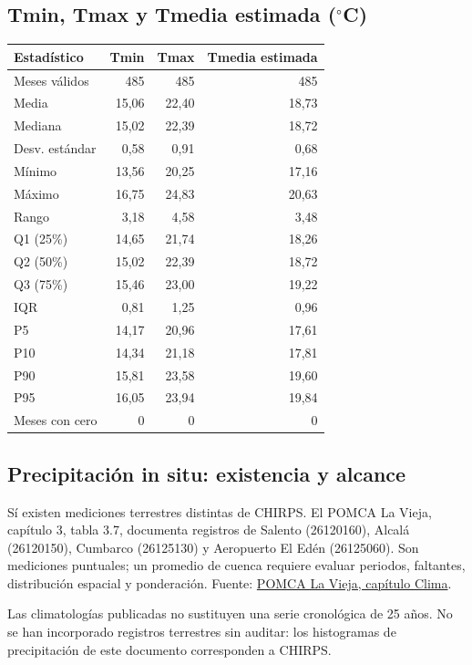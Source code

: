\subsection*{Tmin, Tmax y Tmedia estimada ($^\circ$C)}
\begin{center}\small\begin{tabular}{lrrr}\hline
Estadístico & Tmin & Tmax & Tmedia estimada \\ \hline
Meses válidos & 485 & 485 & 485 \\
Media & 15,06 & 22,40 & 18,73 \\
Mediana & 15,02 & 22,39 & 18,72 \\
Desv. estándar & 0,58 & 0,91 & 0,68 \\
Mínimo & 13,56 & 20,25 & 17,16 \\
Máximo & 16,75 & 24,83 & 20,63 \\
Rango & 3,18 & 4,58 & 3,48 \\
Q1 (25\%) & 14,65 & 21,74 & 18,26 \\
Q2 (50\%) & 15,02 & 22,39 & 18,72 \\
Q3 (75\%) & 15,46 & 23,00 & 19,22 \\
IQR & 0,81 & 1,25 & 0,96 \\
P5 & 14,17 & 20,96 & 17,61 \\
P10 & 14,34 & 21,18 & 17,81 \\
P90 & 15,81 & 23,58 & 19,60 \\
P95 & 16,05 & 23,94 & 19,84 \\
Meses con cero & 0 & 0 & 0 \\
\hline\end{tabular}\end{center}
\subsection{Precipitación in situ: existencia y alcance}
Sí existen mediciones terrestres distintas de CHIRPS. El POMCA La Vieja,
capítulo 3, tabla 3.7, documenta registros de Salento (26120160), Alcalá
(26120150), Cumbarco (26125130) y Aeropuerto El Edén (26125060).
Son mediciones puntuales; un promedio de cuenca requiere evaluar periodos,
faltantes, distribución espacial y ponderación. Fuente:
\href{https://www.cvc.gov.co/sites/default/files/Planes_y_Programas/Planes_de_Ordenacion_y_Manejo_de_Cuencas_Hidrografica/La%20Vieja%20-%20POMCA%20en%20Ajuste/Fase%20Diagnostico/3_CapituloI_Diagnostico_Clima.pdf}{POMCA La Vieja, capítulo Clima}.

Las climatologías publicadas no sustituyen una serie cronológica de 25 años.
No se han incorporado registros terrestres sin auditar: los histogramas de
precipitación de este documento corresponden a CHIRPS.
